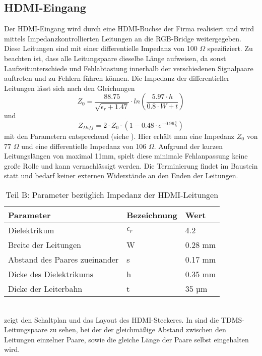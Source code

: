 \subsection{HDMI-Eingang}
\label{cha:hdmi_eingang}
Der HDMI-Eingang wird durch eine HDMI-Buchse der Firma  realisiert und wird mittels Impedanzkontrollierten Leitungen an die RGB-Bridge weitergegeben. Diese Leitungen sind mit einer differentielle Impedanz von 100 $\Omega$ spezifiziert. Zu beachten ist, dass alle Leitungspaare dieselbe Länge aufweisen, da sonst Laufzeitunterschiede und Fehlabtastung innerhalb der verschiedenen Signalpaare auftreten und zu Fehlern führen können. Die Impedanz der differentieller Leitungen lässt sich nach den Gleichungen 
%
\begin{equation}
Z_0 = \frac{88.75}{\sqrt{\epsilon_r + 1.47}} \cdot ln\left(\frac{5.97 \cdot h}{0.8 \cdot W + t}\right)
\label{equ:z_0}
\end{equation}
%
und
%
\begin{equation}
Z_{Diff} = 2 \cdot Z_0  \cdot \left(1-0.48 \cdot e^{-0.96\frac{s}{h}}\right)
\label{equ:z_diff}
\end{equation}
%
mit den Parametern entsprechend  (siehe \cite{TI2007}). Hier erhält man eine Impedanz $Z_0$ von 77 $\Omega$ und eine differentielle Impedanz von 106 $\Omega$. Aufgrund der kurzen Leitungslängen von maximal 11mm, spielt diese minimale Fehlanpassung keine große Rolle und kann vernachlässigt werden. Die Terminierung findet im Baustein statt und bedarf keiner externen Widerstände an den Enden der Leitungen.
\begin{table}[h]
\begin{tabular}{|p{7cm}|p{3cm}|p{3cm}|}\hline
\rowcolor{TableBackgroundColor} 
   \textbf{Parameter} & \textbf{Bezeichnung} & \textbf{Wert}	\\ \hline
    Dielektrikum 					& $\epsilon_r$	& 4.2		\\ \hline
	Breite der Leitungen  		 	& W 			& 0.28 mm	\\ \hline
	Abstand des Paares zueinander 	& s 			& 0.17 mm 	\\ \hline
	Dicke des Dielektrikums 		& h 			& 0.35 mm 	\\ \hline 
	Dicke der Leiterbahn 			& t 			& 35 µm		\\ \hline 
\end{tabular}
\caption{Teil B: Parameter bezüglich Impedanz der HDMI-Leitungen}
\label{tab:z_parameter}
\end{table} \\
 zeigt den Schaltplan und das Layout des HDMI-Steckeres. In  sind die TDMS-Leitungspaare zu sehen, bei der der gleichmäßige Abstand zwischen den Leitungen einzelner Paare, sowie die gleiche Länge der Paare selbst eingehalten wird. 


